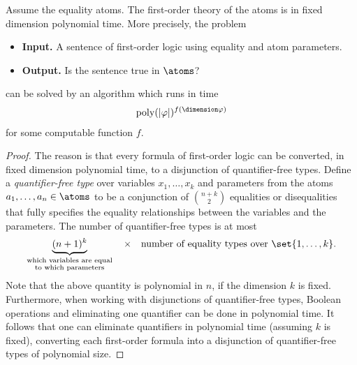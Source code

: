 \begin{lemma} \label{lem:fdp-sat} Assume the equality atoms. The first-order theory of the atoms is in fixed dimension polynomial time. More precisely, the problem
 \begin{itemize}
 \item {\bf Input.} A sentence of first-order logic using equality and atom parameters.
 \item {\bf Output.} Is the sentence true in $\atoms$?
 \end{itemize} 
 can be solved by an algorithm which runs in time
 \begin{align*}
 \mathrm{poly}(|\varphi|)^{f( \dimension \varphi)}
 \end{align*}
 for some computable function $f$.
\end{lemma}
\begin{proof}
 The reason is that every formula of first-order logic can be converted, in fixed dimension polynomial time, to a disjunction of quantifier-free types. 
 Define a \emph{quantifier-free type} over variables $x_1,\ldots,x_k$ and parameters from the atoms $a_1,\ldots,a_n \in \atoms$ to be a conjunction of 
 ${n+k} \choose 2$
 equalities or disequalities that fully specifies the equality relationships between the variables and the parameters. The number of quantifier-free types is at most 
\begin{align*}
 \underbrace{(n+1)^k}_{\substack{\text{which variables are equal}\\ \text{to which parameters}}} \quad \times \quad {\text{number of equality types over $\set{1,\ldots,k}$}}.
\end{align*}
Note that the above quantity is polynomial in $n$, if the dimension $k$ is fixed. Furthermore, when working with disjunctions of quantifier-free types, Boolean operations and eliminating one quantifier can be done in polynomial time. It follows that one can eliminate quantifiers in polynomial time (assuming $k$ is fixed), converting each first-order formula into a disjunction of quantifier-free types of polynomial size. 
\end{proof}


